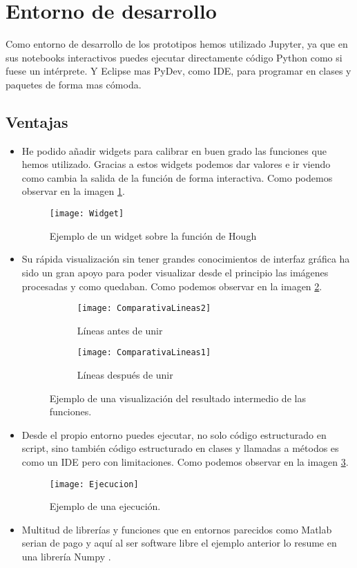 
\section{Entorno de desarrollo}
Como entorno de desarrollo de los prototipos hemos utilizado Jupyter, ya que en sus notebooks interactivos puedes ejecutar directamente código Python como si fuese un intérprete.
Y Eclipse mas PyDev, como IDE, para programar en clases y paquetes de forma mas cómoda.
\subsection{Ventajas}
\begin{itemize}
\item He podido añadir widgets para calibrar en buen grado las funciones que hemos utilizado.
Gracias a estos widgets podemos dar valores e ir viendo como cambia la salida de la función de forma interactiva. Como podemos observar en la imagen \ref{fig:5.1}.

\begin{figure}[h]
\centering
\texttt{[image: Widget]}
\caption{Ejemplo de un widget sobre la función de Hough}
\label{fig:5.1}
\end{figure}

\item Su rápida visualización sin tener grandes conocimientos de interfaz gráfica ha sido un gran apoyo para poder visualizar desde el principio las imágenes procesadas y como quedaban. Como podemos observar en la imagen \ref{fig:5.2}. 

\begin{figure}
\begin{subfigure}[b]{.5\linewidth}
\centering\large \texttt{[image: ComparativaLineas2]}
\caption{Líneas antes de unir}
\end{subfigure}%
\begin{subfigure}[b]{.5\linewidth}
\centering\large \texttt{[image: ComparativaLineas1]}
\caption{Líneas después de unir}
\end{subfigure}
\caption{Ejemplo de una visualización del resultado intermedio de las funciones.}\label{fig:5.2}
\end{figure}


\item Desde el propio entorno puedes ejecutar, no solo código estructurado en script, sino también código estructurado en clases y llamadas a métodos es como un IDE pero con limitaciones. Como podemos observar en la imagen \ref{fig:5.3}.

\begin{figure}[h]
\centering
\texttt{[image: Ejecucion]}
\caption{Ejemplo de una ejecución.}
\label{fig:5.3}
\end{figure}

\item Multitud de librerías y funciones que en entornos parecidos como Matlab serian de pago y aquí al ser software libre el ejemplo anterior lo resume en una librería Numpy \cite{Numpy}.
\end{itemize}

